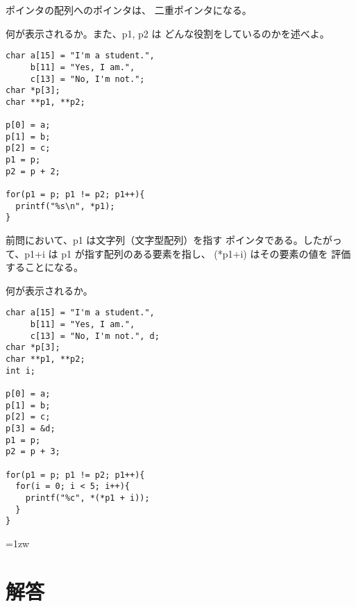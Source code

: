 \documentclass[12pt,a4j]{jarticle}
\makeatletter
\newif\if@myansweropen
\def\themyanswer{%
\immediate\closeout\@filemyanswer%
\global\@myansweropenfalse%
\pagebreak[4]
\begin{multicols*}{2}\raggedright\parindent=1zw
\section*{解答}%
\def\figsize{.6}
\begingroup\small\endgroup%
\end{multicols*}
}
\newcounter{toi}
\def\toi{%
\bigskip\bigskip\noindent
\addtocounter{toi}{1}
\shadowbox{\bfseries\large 問\thetoi}
\nopagebreak[4]\bigskip\nopagebreak[4]
}
\def\figsize{.85}
\makeatother
\begin{document}
\toi

ポインタの配列へのポインタは、
二重ポインタになる。

何が表示されるか。また、{\ttfamily p1, p2} は
どんな役割をしているのかを述べよ。

\begin{verbatim}
char a[15] = "I'm a student.", 
     b[11] = "Yes, I am.",
     c[13] = "No, I'm not.";
char *p[3];
char **p1, **p2;

p[0] = a;
p[1] = b;
p[2] = c;
p1 = p;
p2 = p + 2;

for(p1 = p; p1 != p2; p1++){
  printf("%s\n", *p1);
}
\end{verbatim}








\toi


前問において、{\ttfamily *p1} は文字列（文字型配列）を指す
ポインタである。したがって、{\ttfamily *p1+i} は
{\ttfamily p1} が指す配列のある要素を指し、
{\ttfamily *(*p1+i)} はその要素の値を
評価することになる。


何が表示されるか。

\begin{verbatim}
char a[15] = "I'm a student.", 
     b[11] = "Yes, I am.",
     c[13] = "No, I'm not.", d;
char *p[3];
char **p1, **p2;
int i;

p[0] = a;
p[1] = b;
p[2] = c;
p[3] = &d;
p1 = p;
p2 = p + 3;

for(p1 = p; p1 != p2; p1++){
  for(i = 0; i < 5; i++){
    printf("%c", *(*p1 + i));
  }
}
\end{verbatim}
















%
%
\themyanswer




\end{document}

